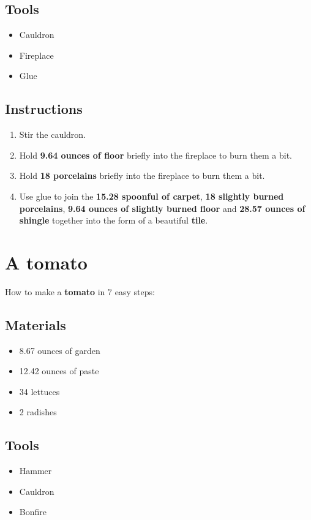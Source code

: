 \documentclass{article}
\begin{document}
\subsection{Tools}\begin{itemize}
\item 
Cauldron
\item 
Fireplace
\item 
Glue
\end{itemize}
\subsection{Instructions}\begin{enumerate}
\item 
Stir the cauldron.
\item 
Hold \textbf{9.64 ounces of floor} briefly into the fireplace to burn them a bit.
\item 
Hold \textbf{18 porcelains} briefly into the fireplace to burn them a bit.
\item 
Use glue to join the \textbf{15.28 spoonful of carpet}, \textbf{18 slightly burned porcelains}, \textbf{9.64 ounces of slightly burned floor} and \textbf{28.57 ounces of shingle} together into the form of a beautiful \textbf{tile}.
\end{enumerate}
\newpage
\section{A tomato}How to make a \textbf{tomato} in 7 easy steps:

\subsection{Materials}\begin{itemize}
\item 
8.67 ounces of garden
\item 
12.42 ounces of paste
\item 
34 lettuces
\item 
2 radishes
\end{itemize}
\subsection{Tools}\begin{itemize}
\item 
Hammer
\item 
Cauldron
\item 
Bonfire
\end{itemize}
\end{document}

